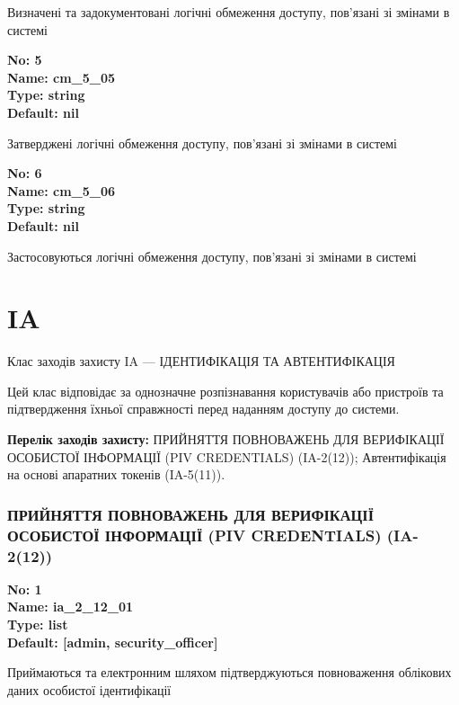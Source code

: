 \documentclass{article}
\begin{document}
{\footnotesize Визначені та задокументовані логічні обмеження доступу, пов'язані зі змінами в системі}


{\footnotesize\bfseries
No: 5\\
Name: cm\_\allowbreak{}5\_\allowbreak{}05\\
Type: string\\
Default: nil
}

{\footnotesize Затверджені логічні обмеження доступу, пов'язані зі змінами в системі}


{\footnotesize\bfseries
No: 6\\
Name: cm\_\allowbreak{}5\_\allowbreak{}06\\
Type: string\\
Default: nil
}

{\footnotesize Застосовуються логічні обмеження доступу, пов'язані зі змінами в системі}




\section{IA}
Клас заходів захисту IA --- ІДЕНТИФІКАЦІЯ ТА АВТЕНТИФІКАЦІЯ

Цей клас відповідає за однозначне розпізнавання користувачів або пристроїв та підтвердження їхньої справжності перед наданням доступу до системи.

\textbf{Перелік заходів захисту:} ПРИЙНЯТТЯ ПОВНОВАЖЕНЬ ДЛЯ ВЕРИФІКАЦІЇ ОСОБИСТОЇ ІНФОРМАЦІЇ (PIV CREDENTIALS) (IA-2(12)); Автентифікація на основі апаратних токенів (IA-5(11)).

\subsubsection{ПРИЙНЯТТЯ ПОВНОВАЖЕНЬ ДЛЯ ВЕРИФІКАЦІЇ ОСОБИСТОЇ ІНФОРМАЦІЇ (PIV CREDENTIALS) (IA-2(12))}


\vspace{10pt}
{\footnotesize\bfseries
No: 1\\
Name: ia\_\allowbreak{}2\_\allowbreak{}12\_\allowbreak{}01\\
Type: list\\
Default: [\textquotedbl{}admin\textquotedbl{}, \textquotedbl{}security\_\allowbreak{}officer\textquotedbl{}]
}

{\footnotesize Приймаються та електронним шляхом підтверджуються повноваження облікових даних особистої ідентифікації}
\end{document}
